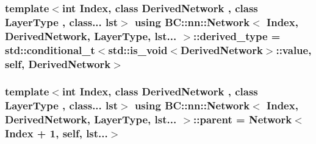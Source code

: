 \subsubsection[{\texorpdfstring{derived\+\_\+type}{derived_type}}]{\setlength{\rightskip}{0pt plus 5cm}template$<$int Index, class Derived\+Network , class Layer\+Type , class... lst$>$ using {\bf B\+C\+::nn\+::\+Network}$<$ Index, Derived\+Network, Layer\+Type, lst... $>$\+::{\bf derived\+\_\+type} =  std\+::conditional\+\_\+t$<$std\+::is\+\_\+void$<$Derived\+Network$>$\+::value, {\bf self}, Derived\+Network$>$}\hypertarget{structBC_1_1nn_1_1Network_3_01Index_00_01DerivedNetwork_00_01LayerType_00_01lst_8_8_8_01_4_a2d569862e77d1ef47c5d99303b497a3c}{}\label{structBC_1_1nn_1_1Network_3_01Index_00_01DerivedNetwork_00_01LayerType_00_01lst_8_8_8_01_4_a2d569862e77d1ef47c5d99303b497a3c}
\subsubsection[{\texorpdfstring{parent}{parent}}]{\setlength{\rightskip}{0pt plus 5cm}template$<$int Index, class Derived\+Network , class Layer\+Type , class... lst$>$ using {\bf B\+C\+::nn\+::\+Network}$<$ Index, Derived\+Network, Layer\+Type, lst... $>$\+::{\bf parent} =  {\bf Network}$<$Index + 1, {\bf self}, lst...$>$}\hypertarget{structBC_1_1nn_1_1Network_3_01Index_00_01DerivedNetwork_00_01LayerType_00_01lst_8_8_8_01_4_a038f3f4682dfb52e16c5baf451376886}{}\label{structBC_1_1nn_1_1Network_3_01Index_00_01DerivedNetwork_00_01LayerType_00_01lst_8_8_8_01_4_a038f3f4682dfb52e16c5baf451376886}
